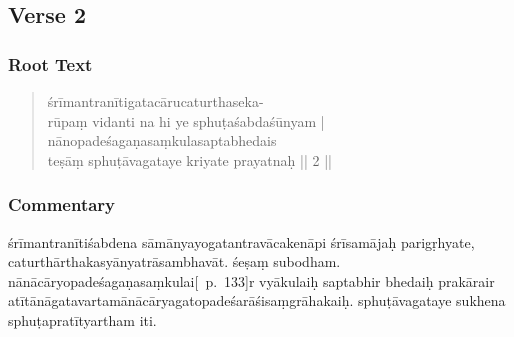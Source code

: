 \documentclass[12pt]{article}
\begin{document}
\subsection{Verse 2}
\subsubsection{Root Text}
\begin{quote}
	śrīmantranītigatacārucaturthaseka-\\
	rūpaṃ vidanti na hi ye sphuṭaśabdaśūnyam |\\
	nānopadeśagaṇasaṃkulasaptabhedais\\
	teṣāṃ sphuṭāvagataye kriyate prayatnaḥ || 2 ||

% 
\end{quote}

\subsubsection{Commentary}
śrīmantranītiśabdena sāmānyayogatantravācakenāpi śrīsamājaḥ parigṛhyate, caturthārthakasyānyatrāsambhavāt.
śeṣaṃ subodham.
nānācāryopadeśagaṇasaṃkulai\hspace{0em}[\EDD\ p.\ 133]\hspace{0em}r vyākulaiḥ saptabhir bhedaiḥ prakārair atītānāgatavartamānācārya\footnoteB{
	°vartamānā°] \EDD ; °pravartamānā° \MS
}gatopadeśarāśisaṃgrāhakaiḥ.
sphuṭāvagataye sukhena sphuṭapratītyartham iti.
\end{document}

